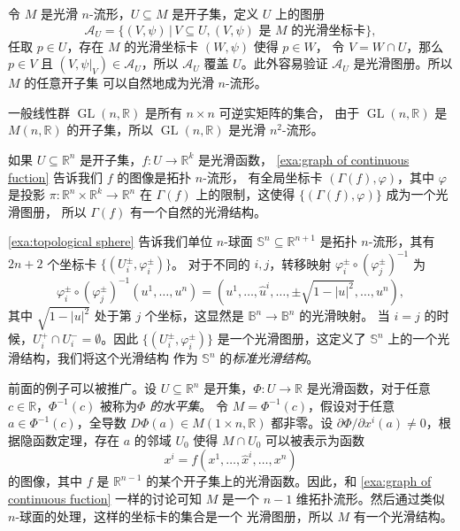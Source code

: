\documentclass[fontset=none]{Notes}
\DeclareMathOperator\GL{GL}
\begin{document}
\begin{example}[开子流形]
  令 $M$ 是光滑 $n$-流形，$U\subseteq M$ 是开子集，定义 $U$ 上的图册
  \[
    \mathcal{A}_U=\{(V,\psi)\,|\,V\subseteq U,\text{$(V,\psi)$ 是 $M$ 的光滑坐标卡}\},  
  \]
  任取 $p\in U$，存在 $M$ 的光滑坐标卡 $(W,\psi)$ 使得 $p\in W$，
  令 $V=W\cap U$，那么 $p\in V$ 且 $(V,\psi|_V)\in\mathcal{A}_U$，所以 $\mathcal{A}_U$
  覆盖 $U$。此外容易验证 $\mathcal{A}_U$ 是光滑图册。所以 $M$ 的任意开子集
  可以自然地成为光滑 $n$-流形。
\end{example}

\begin{example}[一般线性群]
  一般线性群 $\GL(n,\mathbb{R})$ 是所有 $n\times n$ 可逆实矩阵的集合，
  由于 $\GL(n,\mathbb{R})$ 是 $M(n,\mathbb{R})$ 的开子集，所以 $\GL(n,\mathbb{R})$
  是光滑 $n^2$-流形。
\end{example}

\begin{example}[光滑函数的图像]
  如果 $U\subseteq\mathbb{R}^n$ 是开子集，$f:U\to\mathbb{R}^k$ 是光滑函数，
  \autoref{exa:graph of continuous fuction} 告诉我们 $f$ 的图像是拓扑 $n$-流形，
  有全局坐标卡 $(\Gamma(f),\varphi)$，其中 $\varphi$ 是投影 $\pi:\mathbb{R}^{n}\times\mathbb{R}^k\to\mathbb{R}^n$
  在 $\Gamma(f)$ 上的限制，这使得 $\{(\Gamma(f),\varphi)\}$ 成为一个光滑图册，
  所以 $\Gamma(f)$ 有一个自然的光滑结构。
\end{example}

\begin{example}[球面]
  \autoref{exa:topological sphere} 告诉我们单位 $n$-球面 $\mathbb{S}^n\subseteq\mathbb{R}^{n+1}$
  是拓扑 $n$-流形，其有 $2n+2$ 个坐标卡 $\{(U_i^\pm,\varphi_i^\pm)\}$。
  对于不同的 $i,j$，转移映射 $\varphi_i^\pm\circ(\varphi_j^\pm)^{-1}$ 为
  \[
    \varphi_i^\pm\circ(\varphi_j^\pm)^{-1}(u^1,\dots,u^{n})=
    \left(u^1,\dots,\hat{u}^i,\dots,\pm\sqrt{1-|u|^2},\dots,u^n\right),
  \]
  其中 $\sqrt{1-|u|^2}$ 处于第 $j$ 个坐标，这显然是 $\mathbb{B}^n\to\mathbb{B}^n$ 的光滑映射。
  当 $i=j$ 的时候，$U_i^+\cap U_i^-=\emptyset$。因此 $\{(U_i^\pm,\varphi_i^\pm)\}$
  是一个光滑图册，这定义了 $\mathbb{S}^n$ 上的一个光滑结构，我们将这个光滑结构
  作为 $\mathbb{S}^n$ 的\emph{标准光滑结构}。
\end{example}

\begin{example}[水平集]
  前面的例子可以被推广。设 $U\subseteq\mathbb{R}^n$ 是开集，$\Phi:U\to\mathbb{R}$
  是光滑函数，对于任意 $c\in\mathbb{R}$，$\Phi^{-1}(c)$ 被称为\emph{$\Phi$ 的水平集}。
  令 $M=\Phi^{-1}(c)$，假设对于任意 $a\in\Phi^{-1}(c)$，全导数 $D\Phi(a)\in M(1\times n,\mathbb{R})$
  都非零。设 $\partial\Phi/\partial x^i(a)\neq 0$，根据隐函数定理，存在 $a$
  的邻域 $U_0$ 使得 $M\cap U_0$ 可以被表示为函数
  \[
    x^i=f(x^1,\dots,\hat{x}^i,\dots,x^n)  
  \]
  的图像，其中 $f$ 是 $\mathbb{R}^{n-1}$ 的某个开子集上的光滑函数。因此，和
  \autoref{exa:graph of continuous fuction} 一样的讨论可知 $M$ 是一个
  $n-1$ 维拓扑流形。然后通过类似 $n$-球面的处理，这样的坐标卡的集合是一个
  光滑图册，所以 $M$ 有一个光滑结构。
\end{example}
\end{document}
